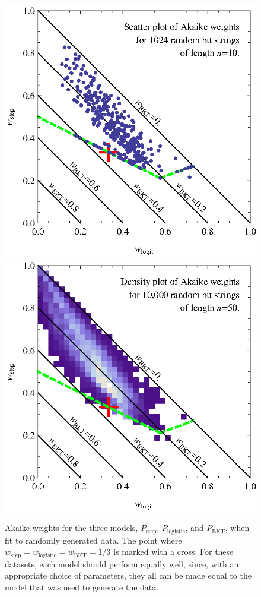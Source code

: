 \documentclass{acmlarge-edm}
\begin{document}
\begin{figure}
  \includegraphics{scatter10.eps} \hfill
  \includegraphics{density50.eps}
  \caption{Akaike weights for the three models, 
   $P_\mathrm{step}$, $P_\mathrm{logistic}$, and $P_\mathrm{BKT}$, 
   when fit to randomly generated data.  The point where
   $w_\mathrm{step}=w_\mathrm{logistic}=w_\mathrm{BKT}=1/3$ is
   marked with a cross.  For these datasets, each 
   model should perform equally well, since, with an appropriate
   choice of parameters, they all can be made equal to 
   the model that was used to generate the data.}\label{scatter2}
\end{figure}
\end{document}
